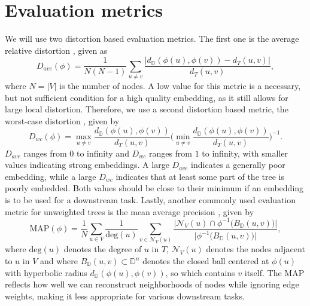 \section{Evaluation metrics}
\label{sec:metrics}
We will use two distortion based evaluation metrics. The first one is the average relative distortion \citep{sala2018representation}, given as
\begin{equation}
    D_{ave} (\phi) = \frac{1}{N(N-1)} \sum_{u \neq v} \frac{|d_{\mathbb{D}} (\phi(u), \phi(v)) - d_T (u, v)|}{d_T (u, v)},
\end{equation}
where $N = |V|$ is the number of nodes. A low value for this metric is a necessary, but not sufficient condition for a high quality embedding, as it still allows for large local distortion. Therefore, we use a second distortion based metric, the worst-case distortion \citep{sarkar2011low}, given by
\begin{equation}
    D_{wc} (\phi) = \max_{u \neq v} \frac{d_\mathbb{D}(\phi(u), \phi(v))}{d_T (u, v)} \bigg( \min_{u \neq v} \frac{d_\mathbb{D}(\phi(u), \phi(v))}{d_T (u, v)} \bigg)^{-1}.
\end{equation}
$D_{ave}$ ranges from $0$ to infinity and $D_{wc}$ ranges from $1$ to infinity, with smaller values indicating strong embeddings. A large $D_{ave}$ indicates a generally poor embedding, while a large $D_{wc}$ indicates that at least some part of the tree is poorly embedded. Both values should be close to their minimum if an embedding is to be used for a downstream task. Lastly, another commonly used evaluation metric for unweighted trees is the mean average precision \citep{nickel2017poincare}, given by 
\begin{equation}
    \text{MAP}(\phi) = \frac{1}{N} \sum_{u \in V} \frac{1}{\text{deg}(u)} \sum_{v \in \mathcal{N}_V (u)} \frac{\Big|\mathcal{N}_V(u) \cap \phi^{-1} \Big(B_{\mathbb{D}}(u, v)\Big)\Big|}{\Big| \phi^{-1} \Big(B_{\mathbb{D}}(u, v)\Big) \Big|},
\end{equation}
where $\text{deg}(u)$ denotes the degree of $u$ in $T$, $\mathcal{N}_V (u)$ denotes the nodes adjacent to $u$ in $V$ and where $B_{\mathbb{D}} (u, v) \subset \mathbb{D}^n$ denotes the closed ball centered at $\phi(u)$ with hyperbolic radius $d_\mathbb{D}(\phi(u), \phi(v))$, so which contains $v$ itself. The MAP reflects how well we can reconstruct neighborhoods of nodes while ignoring edge weights, making it less appropriate for various downstream tasks. 

